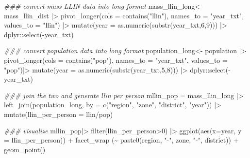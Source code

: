 \documentclass[
  letterpaper,
  DIV=11,
  numbers=noendperiod]{scrreprt}
\newenvironment{Shaded}{\begin{snugshade}}{\end{snugshade}}
\newcommand{\AttributeTok}[1]{\textcolor[rgb]{0.40,0.45,0.13}{#1}}
\newcommand{\DecValTok}[1]{\textcolor[rgb]{0.68,0.00,0.00}{#1}}
\newcommand{\DocumentationTok}[1]{\textcolor[rgb]{0.37,0.37,0.37}{\textit{#1}}}
\newcommand{\FunctionTok}[1]{\textcolor[rgb]{0.28,0.35,0.67}{#1}}
\newcommand{\NormalTok}[1]{\textcolor[rgb]{0.00,0.23,0.31}{#1}}
\newcommand{\OtherTok}[1]{\textcolor[rgb]{0.00,0.23,0.31}{#1}}
\newcommand{\SpecialCharTok}[1]{\textcolor[rgb]{0.37,0.37,0.37}{#1}}
\newcommand{\StringTok}[1]{\textcolor[rgb]{0.13,0.47,0.30}{#1}}
\begin{document}
\begin{Shaded}
\begin{Highlighting}[]
\DocumentationTok{\#\#\# convert mass LLIN data into long format}
\NormalTok{mass\_llin\_long}\OtherTok{\textless{}{-}} 
\NormalTok{  mass\_llin\_dist }\SpecialCharTok{|\textgreater{}}
  \FunctionTok{pivot\_longer}\NormalTok{(}\AttributeTok{cols =} \FunctionTok{contains}\NormalTok{(}\StringTok{"llin"}\NormalTok{),}
               \AttributeTok{names\_to =} \StringTok{"year\_txt"}\NormalTok{, }
               \AttributeTok{values\_to =} \StringTok{"llin"}\NormalTok{) }\SpecialCharTok{|\textgreater{}}
  \FunctionTok{mutate}\NormalTok{(}\AttributeTok{year =} \FunctionTok{as.numeric}\NormalTok{(}\FunctionTok{substr}\NormalTok{(year\_txt,}\DecValTok{6}\NormalTok{,}\DecValTok{9}\NormalTok{))) }\SpecialCharTok{|\textgreater{}}
\NormalTok{  dplyr}\SpecialCharTok{::}\FunctionTok{select}\NormalTok{(}\SpecialCharTok{{-}}\NormalTok{year\_txt)}

\DocumentationTok{\#\#\# convert population data into long format}
\NormalTok{population\_long}\OtherTok{\textless{}{-}}\NormalTok{ population }\SpecialCharTok{|\textgreater{}}
  \FunctionTok{pivot\_longer}\NormalTok{(}\AttributeTok{cols =} \FunctionTok{contains}\NormalTok{(}\StringTok{"pop"}\NormalTok{),}
               \AttributeTok{names\_to =} \StringTok{"year\_txt"}\NormalTok{,}
               \AttributeTok{values\_to =} \StringTok{"pop"}\NormalTok{)}\SpecialCharTok{|\textgreater{}}
  \FunctionTok{mutate}\NormalTok{(}\AttributeTok{year =} \FunctionTok{as.numeric}\NormalTok{(}\FunctionTok{substr}\NormalTok{(year\_txt,}\DecValTok{5}\NormalTok{,}\DecValTok{8}\NormalTok{))) }\SpecialCharTok{|\textgreater{}}
\NormalTok{  dplyr}\SpecialCharTok{::}\FunctionTok{select}\NormalTok{(}\SpecialCharTok{{-}}\NormalTok{year\_txt)}

\DocumentationTok{\#\#\# join the two and generate llin per person}
\NormalTok{  mllin\_pop }\OtherTok{=}\NormalTok{ mass\_llin\_long }\SpecialCharTok{|\textgreater{}}
  \FunctionTok{left\_join}\NormalTok{(population\_long,}
            \AttributeTok{by =} \FunctionTok{c}\NormalTok{(}\StringTok{"region"}\NormalTok{,}
                   \StringTok{"zone"}\NormalTok{,}
                   \StringTok{"district"}\NormalTok{,}
                   \StringTok{"year"}\NormalTok{)) }\SpecialCharTok{|\textgreater{}}
    \FunctionTok{mutate}\NormalTok{(}\AttributeTok{llin\_per\_person  =}\NormalTok{ llin}\SpecialCharTok{/}\NormalTok{pop)}


\DocumentationTok{\#\#\# visualize}
\NormalTok{mllin\_pop}\SpecialCharTok{|\textgreater{}} 
    \FunctionTok{filter}\NormalTok{(llin\_per\_person}\SpecialCharTok{\textgreater{}}\DecValTok{0}\NormalTok{) }\SpecialCharTok{|\textgreater{}}
    \FunctionTok{ggplot}\NormalTok{(}\FunctionTok{aes}\NormalTok{(}\AttributeTok{x=}\NormalTok{year, }\AttributeTok{y =}\NormalTok{ llin\_per\_person)) }\SpecialCharTok{+}
    \FunctionTok{facet\_wrap}\NormalTok{ (}\SpecialCharTok{\textasciitilde{}} \FunctionTok{paste0}\NormalTok{(region, }\StringTok{"{-}"}\NormalTok{, zone, }\StringTok{"{-}"}\NormalTok{, district)) }\SpecialCharTok{+}
    \FunctionTok{geom\_point}\NormalTok{()}
\end{Highlighting}
\end{Shaded}
\end{document}
